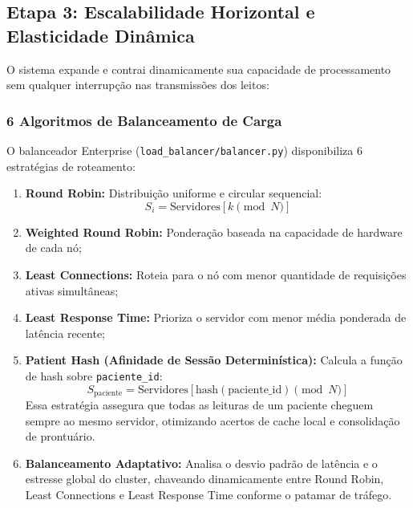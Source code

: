 \documentclass[12pt,a4paper]{article}
\begin{document}
\subsection{Etapa 3: Escalabilidade Horizontal e Elasticidade Dinâmica}
O sistema expande e contrai dinamicamente sua capacidade de processamento sem qualquer interrupção nas transmissões dos leitos:

\subsubsection{6 Algoritmos de Balanceamento de Carga}
O balanceador Enterprise (\texttt{load\_balancer/balancer.py}) disponibiliza 6 estratégias de roteamento:
\begin{enumerate}
	\item \textbf{Round Robin:} Distribuição uniforme e circular sequencial:
	\begin{equation}
		S_i = \text{Servidores}\left[ k \pmod N \right]
	\end{equation}
	\item \textbf{Weighted Round Robin:} Ponderação baseada na capacidade de hardware de cada nó;
	\item \textbf{Least Connections:} Roteia para o nó com menor quantidade de requisições ativas simultâneas;
	\item \textbf{Least Response Time:} Prioriza o servidor com menor média ponderada de latência recente;
	\item \textbf{Patient Hash (Afinidade de Sessão Determinística):} Calcula a função de hash sobre \texttt{paciente\_id}:
	\begin{equation}
		S_{\text{paciente}} = \text{Servidores}\left[ \text{hash}(\text{paciente\_id}) \pmod N \right]
	\end{equation}
	Essa estratégia assegura que todas as leituras de um paciente cheguem sempre ao mesmo servidor, otimizando acertos de cache local e consolidação de prontuário.
	\item \textbf{Balanceamento Adaptativo:} Analisa o desvio padrão de latência e o estresse global do cluster, chaveando dinamicamente entre Round Robin, Least Connections e Least Response Time conforme o patamar de tráfego.
\end{enumerate}
\end{document}
